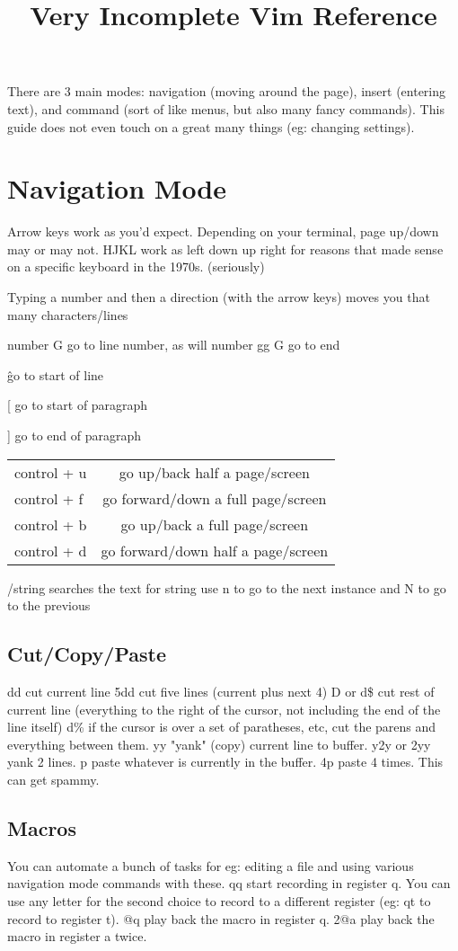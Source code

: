 \documentclass[12pt]{article}
\begin{document}
\title{Very Incomplete Vim Reference}

There are 3 main modes: navigation (moving around the page), insert (entering text), and command (sort of like menus, but also many fancy commands). This guide does not even touch on a great many things (eg: changing settings).
\section{Navigation Mode}
Arrow keys work as you'd expect. Depending on your terminal, page up/down may or may not.
HJKL work as left down up right for reasons that made sense on a specific keyboard in the 1970s. (seriously)

Typing a number and then a direction (with the arrow keys) moves you that many characters/lines

number G go to line number, as will number gg
G go to end

\^ go to start of line

[ go to start of paragraph

] go to end of paragraph


\begin{tabular}{l | c}
control + u & go up/back half a page/screen \\
control + f & go forward/down a full page/screen \\
control + b & go up/back a full page/screen \\
control + d & go forward/down half a page/screen \\
\end{tabular}

/string searches the text for string use n to go to the next instance and N to go to the previous

\subsection{Cut/Copy/Paste}
dd cut current line
5dd cut five lines (current plus next 4)
D or d\$ cut rest of current line (everything to the right of the cursor, not including the end of the line itself)
d\% if the cursor is over a set of paratheses, etc, cut the parens and everything between them.
yy "yank" (copy) current line to buffer.
y2y or 2yy yank 2 lines.
p paste whatever is currently in the buffer.
4p paste 4 times. This can get spammy.

\subsection{Macros}
You can automate a bunch of tasks for eg: editing a file and using various navigation mode commands with these.
qq start recording in register q. You can use any letter for the second choice to record to a different register (eg: qt to record to register t).
@q play back the macro in register q.
2@a play back the macro in register a twice.
\end{document}
